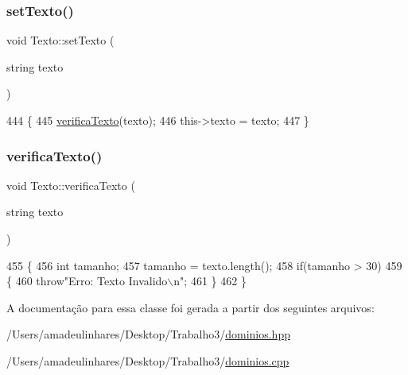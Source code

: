 \subsubsection{\texorpdfstring{set\+Texto()}{setTexto()}}
{\footnotesize\ttfamily void Texto\+::set\+Texto (\begin{DoxyParamCaption}\item[{string}]{texto }\end{DoxyParamCaption})}


\begin{DoxyCode}
444 \{
445   \mbox{\hyperlink{class_texto_a458031559654ecec7e2926f1946494e4}{verificaTexto}}(texto);
446   this->texto = texto;
447 \}
\end{DoxyCode}
\mbox{\label{class_texto_a458031559654ecec7e2926f1946494e4}} 
\subsubsection{\texorpdfstring{verifica\+Texto()}{verificaTexto()}}
{\footnotesize\ttfamily void Texto\+::verifica\+Texto (\begin{DoxyParamCaption}\item[{string}]{texto }\end{DoxyParamCaption})}


\begin{DoxyCode}
455 \{
456   \textcolor{keywordtype}{int} tamanho;
457   tamanho = texto.length();
458   \textcolor{keywordflow}{if}(tamanho > 30)
459   \{
460     \textcolor{keywordflow}{throw}\textcolor{stringliteral}{"Erro: Texto Invalido\(\backslash\)n"};
461   \}
462 \}
\end{DoxyCode}


A documentação para essa classe foi gerada a partir dos seguintes arquivos\+:\begin{DoxyCompactItemize}
\item 
/\+Users/amadeulinhares/\+Desktop/\+Trabalho3/\mbox{\hyperlink{dominios_8hpp}{dominios.\+hpp}}\item 
/\+Users/amadeulinhares/\+Desktop/\+Trabalho3/\mbox{\hyperlink{dominios_8cpp}{dominios.\+cpp}}\end{DoxyCompactItemize}

